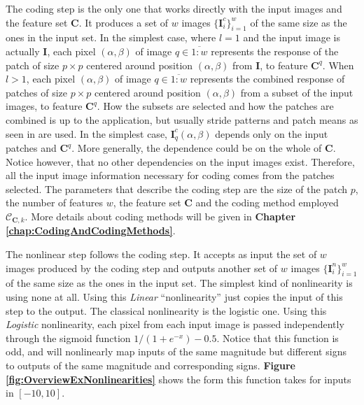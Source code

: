 \documentclass[12pt,a4paper,oneside,english]{UPBThesis}
\newcommand{\hctimes}[2]{{#1}\!\times\!{#2}}
\newcommand{\hcrange}[2]{\overline{{#1}\colon\!\!{#2}}}
\begin{document}
The coding step is the only one that works directly with the input images and the feature set $\textbf{C}$. It produces a set of $w$ images $\{\textbf{I}_i^c\}_{i=1}^{w}$ of the same size as the ones in the input set. In the simplest case, where $l=1$ and the input image is actually $\textbf{I}$, each pixel $(\alpha,\beta)$ of image $q \in \hcrange{1}{w}$ represents the response of the patch of size $\hctimes{p}{p}$ centered around position $(\alpha,\beta)$ from $\textbf{I}$, to feature $\textbf{C}^q$. When $l > 1$, each pixel $(\alpha,\beta)$ of image $q \in \hcrange{1}{w}$ represents the combined response of patches of size $\hctimes{p}{p}$ centered around position $(\alpha,\beta)$ from a subset of the input images, to feature $\textbf{C}^q$. How the subsets are selected and how the patches are combined is up to the application, but usually stride patterns and patch means as seen in \cite{gradient-based-learning} are used. In the simplest case, ${\textbf{I}_q^c}(\alpha,\beta)$ depends only on the input patches and $\textbf{C}^q$. More generally, the dependence could be on the whole of $\textbf{C}$. Notice however, that no other dependencies on the input images exist. Therefore, all the input image information necessary for coding comes from the patches selected. The parameters that describe the coding step are the size of the patch $p$, the number of features $w$, the feature set $\textbf{C}$ and the coding method employed $\mathcal{C}_{\textbf{C},k}$. More details about coding methods will be given in \textbf{Chapter \ref{chap:CodingAndCodingMethods}}.

The nonlinear step follows the coding step. It accepts as input the set of $w$ images produced by the coding step and outputs another set of $w$ images $\{\textbf{I}_i^n\}_{i=1}^w$ of the same size as the ones in the input set. The simplest kind of nonlinearity is using none at all. Using this \emph{Linear} ``nonlinearity'' just copies the input of this step to the output. The classical nonlinearity is the logistic one. Using this \emph{Logistic} nonlinearity, each pixel from each input image is passed independently through the sigmoid function $1 / (1 + e^{-x}) - 0.5$. Notice that this function is odd, and will nonlinearly map inputs of the same magnitude but different signs to outputs of the same magnitude and corresponding signs. \textbf{Figure \ref{fig:OverviewExNonlinearities}} shows the form this function takes for inputs in $[-10,10]$.
\end{document}
